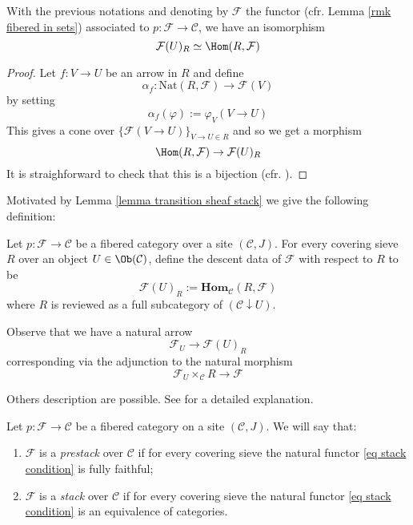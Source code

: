 \begin{lemma} \label{lemma transition sheaf stack}
With the previous notations and denoting by $\mathcal F$ the functor (cfr. Lemma \ref{rmk fibered in sets}) associated to $p \colon \mathcal F \to \mathcal C$, we have an isomorphism
\[
\mathcal F(U)_R \simeq \Hom(R,\mathcal F)
\]
\end{lemma}

\begin{proof}
Let $f \colon V \to U$ be an arrow in $R$ and define
\[
\alpha_f \colon \mathrm{Nat}(R, \mathcal F) \to \mathcal F(V)
\]
by setting
\[
\alpha_f(\varphi) := \varphi_V(V \to U)
\]
This gives a cone over $\{\mathcal F(V \to U)\}_{V \to U \in R}$ and so we get a morphism
\[
\Hom(R,\mathcal F) \to \mathcal F(U)_R
\]
It is straighforward to check that this is a bijection (cfr. ).
\end{proof}

Motivated by Lemma \ref{lemma transition sheaf stack} we give the following definition:

\begin{defin}
Let $p \colon \mathcal F \to \mathcal C$ be a fibered category over a site $(\mathcal C,J)$. For every covering sieve $R$ over an object $U \in \Ob(\mathcal C)$, define the descent data of $\mathcal F$ with respect to $R$ to be
\[
\mathcal F(U)_R := \mathbf{Hom}_{\mathcal C}(R, \mathcal F)
\]
where $R$ is reviewed as a full subcategory of $(\mathcal C \downarrow U)$.
\end{defin}

Observe that we have a natural arrow
\begin{equation} \label{eq stack condition}
\mathcal F_U \to \mathcal F(U)_R
\end{equation}
corresponding via the adjunction to the natural morphism
\[
\mathcal F_U \times_{\mathcal C} R \to \mathcal F
\]

Others description are possible. See  for a detailed explanation.

\begin{defin} \label{def stack}
Let $p \colon \mathcal F \to \mathcal C$ be a fibered category on a site $(\mathcal C,J)$. We will say that:
\begin{enumerate}
\item $\mathcal F$ is a \emph{prestack} over $\mathcal C$ if for every covering sieve the natural functor \eqref{eq stack condition} is fully faithful;
\item $\mathcal F$ is a \emph{stack} over $\mathcal C$ if for every covering sieve the natural functor \eqref{eq stack condition} is an equivalence of categories.
\end{enumerate}
\end{defin}

